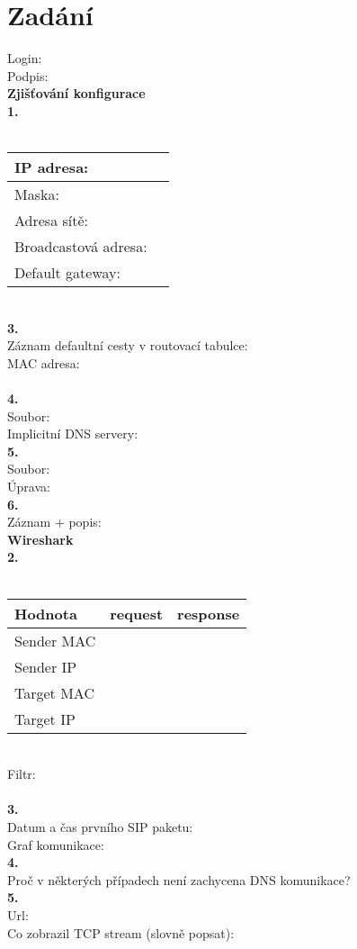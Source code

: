 \section{Zadání}
Login:\\
Podpis:\\

\textbf{Zjišťování konfigurace}\\
\textbf{1.}\\
\\
\begin{tabular}{|l|r|}
\hline
IP adresa: & \hspace{12em} \\
\hline
Maska: & \\
\hline
Adresa sítě: & \\
\hline
Broadcastová adresa: & \\
\hline
Default gateway: & \\
\hline
\end{tabular}
\vspace{1.5em}
\\
\textbf{3.}\\
\vspace{3em}
Záznam defaultní cesty v routovací tabulce:\\
MAC adresa:\\
\\
\textbf{4.}\\
Soubor:\\
\vspace{8em}
Implicitní DNS servery:\\
\textbf{5.}\\
Soubor:\\
\vspace{4em}
Úprava:\\
\newpage
\noindent
\textbf{6.}\\
\vspace{5em}
Záznam + popis:\\
\noindent
\textbf{Wireshark}\\
\textbf{2.}\\
\\
\begin{tabular}{|l|c|c|}
\hline
\textbf{Hodnota} & \textbf{request} & \textbf{response}\\
\hline
Sender MAC & \hspace{10em} & \hspace{10em} \\
\hline
Sender IP & & \\
\hline
Target MAC & & \\
\hline
Target IP & & \\
\hline
\end{tabular}
\vspace{2em}
\\
Filtr:\\
\\
\textbf{3.}\\
Datum a čas prvního SIP paketu:\\
\vspace{25em}
Graf komunikace:\\
\textbf{4.}\\
\vspace{4em}
Proč v některých případech není zachycena DNS komunikace?\\
\textbf{5.}\\
Url:\\
Co zobrazil TCP stream (slovně popsat):\\
